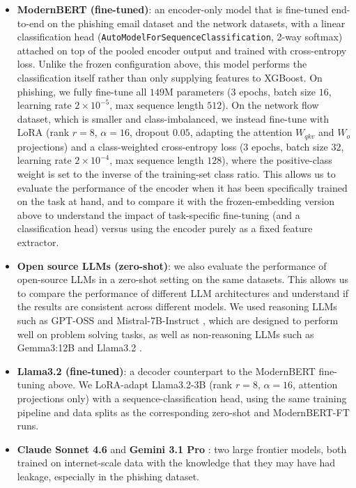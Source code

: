 \documentclass{jmlr}
\begin{document}
\begin{itemize}
\item \textbf{ModernBERT (fine-tuned)}: an encoder-only model that is fine-tuned end-to-end on the phishing email dataset and the network datasets, with a linear classification head (\texttt{AutoModelForSequenceClassification}, 2-way softmax) attached on top of the pooled encoder output and trained with cross-entropy loss. Unlike the frozen configuration above, this model performs the classification itself rather than only supplying features to XGBoost. On phishing, we fully fine-tune all $149$M parameters ($3$ epochs, batch size $16$, learning rate $2\times10^{-5}$, max sequence length $512$). On the network flow dataset, which is smaller and class-imbalanced, we instead fine-tune with LoRA (rank $r=8$, $\alpha=16$, dropout $0.05$, adapting the attention $W_{qkv}$ and $W_o$ projections) and a class-weighted cross-entropy loss ($3$ epochs, batch size $32$, learning rate $2\times10^{-4}$, max sequence length $128$), where the positive-class weight is set to the inverse of the training-set class ratio. This allows us to evaluate the performance of the encoder when it has been specifically trained on the task at hand, and to compare it with the frozen-embedding version above to understand the impact of task-specific fine-tuning (and a classification head) versus using the encoder purely as a fixed feature extractor.
\item \textbf{Open source LLMs (zero-shot)}: we also evaluate the performance of open-source LLMs in a zero-shot setting on the same datasets. This allows us to compare the performance of different LLM architectures and understand if the results are consistent across different models. We used reasoning LLMs such as GPT-OSS \citep{openai2025gptoss} and Mistral-7B-Instruct \citep{jiang2023mistral}, which are designed to perform well on problem solving tasks, as well as non-reasoning LLMs such as Gemma3:12B \citep{gemmateam2025gemma3} and Llama3.2 \citep{llamateam2024herd}.
\item \textbf{Llama3.2 (fine-tuned)}: a decoder counterpart to the ModernBERT fine-tuning above. We LoRA-adapt Llama3.2-3B (rank $r=8$, $\alpha=16$, attention projections only) with a sequence-classification head, using the same training pipeline and data splits as the corresponding zero-shot and ModernBERT-FT runs.
\item \textbf{Claude Sonnet 4.6} \citep{anthropic2026claude} and \textbf{Gemini 3.1 Pro} \citep{google2026gemini}: two large frontier models, both trained on internet-scale data with the knowledge that they may have had leakage, especially in the phishing dataset.
\end{itemize}
\end{document}
